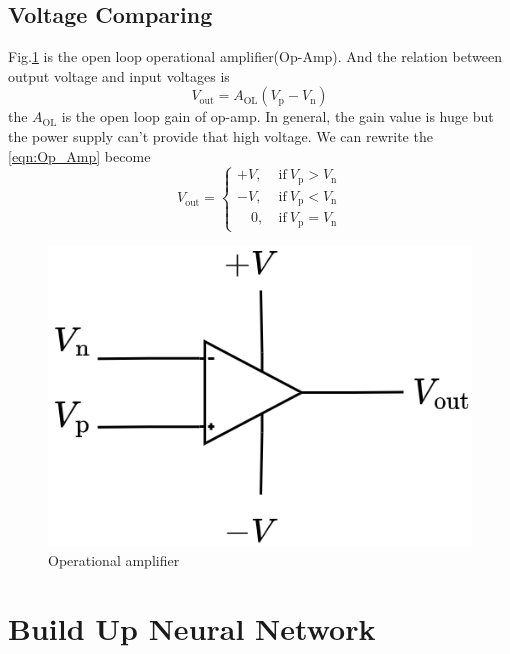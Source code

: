 \documentclass[a4paper, 12pt, AutoFakeBold]{report}
\newcommand{\figref}[1]{Fig.\ref{#1}}
\begin{document}
    \section{Voltage Comparing}
    \label{ch:Voltage_comp}
    \figref{fig:Circuit_op} is the open loop operational amplifier(Op-Amp). And the relation between output voltage and input voltages is
    \begin{equation}
        V_\text{out} = A_\text{OL}\left(V_\text{p}-V_\text{n}\right)
        \label{eqn:Op_Amp}
    \end{equation}
    the $A_\text{OL}$ is the open loop gain of op-amp. In general, the gain value is huge but the power supply can't provide that high voltage. We can rewrite the \eqref{eqn:Op_Amp} become
    \begin{equation}
        V_\text{out} = \begin{cases}
            +V,\ &\text{if}\ V_\text{p}>V_\text{n}\\
            -V,\ &\text{if}\ V_\text{p}<V_\text{n}\\
            \quad 0,\ &\text{if}\ V_\text{p}=V_\text{n}
        \end{cases}
        \label{eqn:Op_comp}
    \end{equation}
    \begin{figure}[H]
        \centering
        \includegraphics[scale=.5]{figs/Circuit_op.png}
        \caption{Operational amplifier}
        \label{fig:Circuit_op}
    \end{figure}

    \chapter{Build Up Neural Network}
\end{document}
